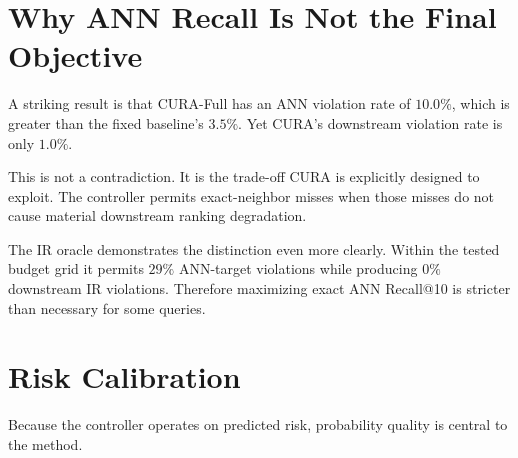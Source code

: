 \documentclass[10pt,twocolumn]{article}
\newcommand{\cura}{CURA}
\begin{document}
\section{Why ANN Recall Is Not the Final Objective}
\label{sec:annvsir}
A striking result is that \cura{}-Full has an ANN violation rate of $10.0\%$, which is greater than the fixed baseline's $3.5\%$. Yet \cura{}'s downstream violation rate is only $1.0\%$.

This is not a contradiction. It is the trade-off \cura{} is explicitly designed to exploit. The controller permits exact-neighbor misses when those misses do not cause material downstream ranking degradation.

The IR oracle demonstrates the distinction even more clearly. Within the tested budget grid it permits $29\%$ ANN-target violations while producing $0\%$ downstream IR violations. Therefore maximizing exact ANN Recall@10 is stricter than necessary for some queries.

\section{Risk Calibration}
\label{sec:calibration}
Because the controller operates on predicted risk, probability quality is central to the method.

\begin{table}[!t]
\centering
\caption{Risk-prediction quality. Lower Brier and ECE are better; higher ROC-AUC is better.}
\label{tab:calibration}
\end{table}
\end{document}
